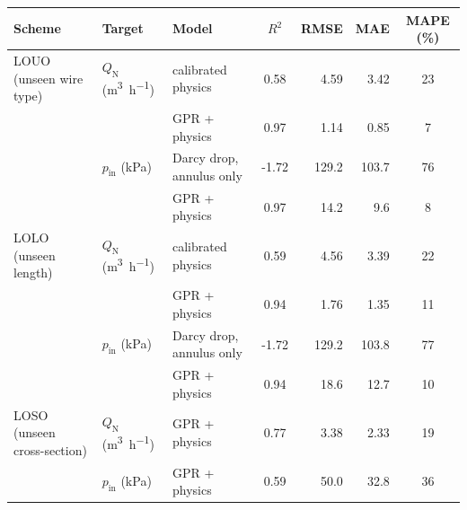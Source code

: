 \begin{tabular}{@{}l l l S[table-format=-1.2] r r S[table-format=2.0]@{}}
\toprule
Scheme & Target & Model & {$R^2$} & {RMSE} & {MAE} & {MAPE (\si{\percent})} \\
\midrule
LOUO (unseen wire type) & $Q_\mathrm{N}$ (\si{\cubic\metre\per\hour}) & calibrated physics & 0.58 & 4.59 & 3.42 & 23 \\
 &  & GPR + physics & 0.97 & 1.14 & 0.85 & 7 \\
\addlinespace[2pt]
 & $p_\mathrm{in}$ (\si{\kilo\pascal}) & Darcy drop, annulus only & -1.72 & 129.2 & 103.7 & 76 \\
 &  & GPR + physics & 0.97 & 14.2 & 9.6 & 8 \\
\midrule
LOLO (unseen length) & $Q_\mathrm{N}$ (\si{\cubic\metre\per\hour}) & calibrated physics & 0.59 & 4.56 & 3.39 & 22 \\
 &  & GPR + physics & 0.94 & 1.76 & 1.35 & 11 \\
\addlinespace[2pt]
 & $p_\mathrm{in}$ (\si{\kilo\pascal}) & Darcy drop, annulus only & -1.72 & 129.2 & 103.8 & 77 \\
 &  & GPR + physics & 0.94 & 18.6 & 12.7 & 10 \\
\midrule
LOSO (unseen cross-section) & $Q_\mathrm{N}$ (\si{\cubic\metre\per\hour}) & GPR + physics & 0.77 & 3.38 & 2.33 & 19 \\
\addlinespace[2pt]
 & $p_\mathrm{in}$ (\si{\kilo\pascal}) & GPR + physics & 0.59 & 50.0 & 32.8 & 36 \\
\bottomrule
\end{tabular}
